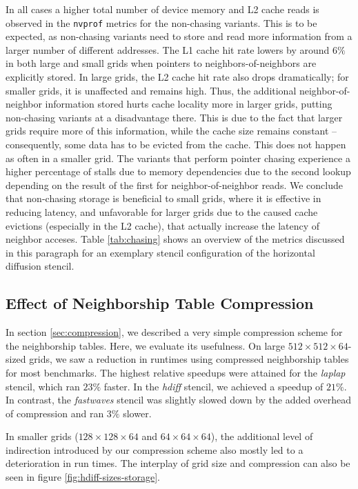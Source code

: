 In all cases a higher total number of device memory and L2 cache reads is observed in the \texttt{nvprof} metrics for the non-chasing variants. This is to be expected, as non-chasing variants need to store and read more information from a larger number of different addresses. The L1 cache hit rate lowers by around $6\%$ in both large and small grids when pointers to neighbors-of-neighbors are explicitly stored. In large grids, the L2 cache hit rate also drops dramatically; for smaller grids, it is unaffected and remains high. Thus, the additional neighbor-of-neighbor information stored hurts cache locality more in larger grids, putting non-chasing variants at a disadvantage there. This is due to the fact that larger grids require more of this information, while the cache size remains constant -- consequently, some data has to be evicted from the cache. This does not happen as often in a smaller grid. The variants that perform pointer chasing experience a higher percentage of stalls due to memory dependencies due to the second lookup depending on the result of the first for neighbor-of-neighbor reads.  We conclude that non-chasing storage is beneficial to small grids, where it is effective in reducing latency, and unfavorable for larger grids due to the caused cache evictions (especially in the L2 cache), that actually increase the latency of neighbor acceses. Table \ref{tab:chasing} shows an overview of the metrics discussed in this paragraph for an exemplary stencil configuration of the horizontal diffusion stencil.

\subsection{Effect of Neighborship Table Compression}

In section \ref{sec:compression}, we described a very simple compression scheme for the neighborship tables. Here, we evaluate its usefulness. On large $512\times 512\times 64$-sized grids, we saw a reduction in runtimes using compressed neighborship tables for most benchmarks. The highest relative speedups were attained for the \emph{laplap} stencil, which ran $23\%$ faster. In the \emph{hdiff} stencil, we achieved a speedup of $21\%$. In contrast, the \emph{fastwaves} stencil was slightly slowed down by the added overhead of compression and ran $3\%$ slower.

In smaller grids ($128\times 128\times 64$ and $64\times 64\times 64$), the additional level of indirection introduced by our compression scheme also mostly led to a deterioration in run times. The interplay of grid size and compression can also be seen in figure \ref{fig:hdiff-sizes-storage}.

